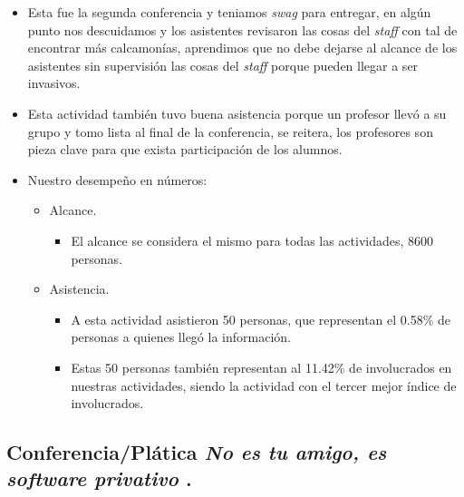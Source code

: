 \documentclass[a4paper,11pt]{article}                 %
\begin{document}
    \begin{itemize}
    \item Esta fue la segunda conferencia y teniamos \textit{swag} para entregar, en algún punto nos descuidamos y los asistentes revisaron las cosas del \textit{staff} con tal de encontrar más calcamonías, aprendimos que no debe dejarse al alcance de los asistentes sin supervisión las cosas del \textit{staff} porque pueden llegar a ser invasivos.
    \item Esta actividad también tuvo buena asistencia porque un profesor llevó a su grupo y tomo lista al final de la conferencia, se reitera, los profesores son pieza clave para que exista participación de los alumnos.
    
    \item Nuestro desempeño en números:
    
    \begin{itemize}
    \item Alcance.
    \begin{itemize}
      \item El alcance se considera el mismo para todas las actividades, 8600 personas.
    \end{itemize}

    \item Asistencia.
    \begin{itemize}
      \item A esta actividad asistieron 50 personas, que representan el 0.58\% de personas a quienes llegó la información.
      \item Estas 50 personas también representan al 11.42\%  de involucrados en nuestras actividades, siendo la actividad con el tercer mejor índice de involucrados. 
    \end{itemize}
    \end{itemize} 
    
  \end{itemize}
  \subsection{Conferencia/Plática  \textit{No es tu amigo, es software privativo} .}  
  
\end{document}
